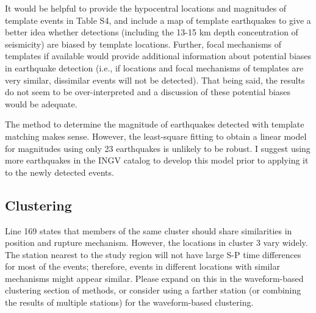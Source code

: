 \documentclass[10pt]{extarticle}
\begin{document}
\begin{Answer}
 \WorkInProgressRevTask
\end{Answer}
%
%



\begin{ReviewerComment}{1}
\noindent 
It would be helpful to provide the hypocentral locations and magnitudes of template events in Table S4, and include a map of template earthquakes to give a better idea whether detections (including the 13-15 km depth concentration of seismicity) are biased by template locations. Further, focal mechanisms of templates if available would provide additional information about potential biases in earthquake detection (i.e., if locations and focal mechanisms of templates are very similar, dissimilar events will not be detected). That being said, the results do not seem to be over-interpreted and a discussion of these potential biases would be adequate.

\end{ReviewerComment}


\begin{Answer}
 \WorkInProgressRevTask
\end{Answer}
%
%



\begin{ReviewerComment}{1}
\noindent 
The method to determine the magnitude of earthquakes detected with template matching makes sense. However, the least-square fitting to obtain a linear model for magnitudes using only 23 earthquakes is unlikely to be robust. I suggest using more earthquakes in the INGV catalog to develop this model prior to applying it to the newly detected events.

\end{ReviewerComment}


\begin{Answer}
 \WorkInProgressRevTask
\end{Answer}
%
%

\subsection*{Clustering}

\begin{ReviewerComment}{1}
\noindent 
Line 169 states that members of the same cluster should share similarities in position and rupture mechanism.  However, the locations in cluster 3 vary widely. The station nearest to the study region will not have large S-P time differences for most of the events; therefore, events in different locations with similar mechanisms might appear similar. Please expand on this in the waveform-based clustering section of methods, or consider using a farther station (or combining the results of multiple stations) for the waveform-based clustering.

\end{ReviewerComment}
\end{document}
